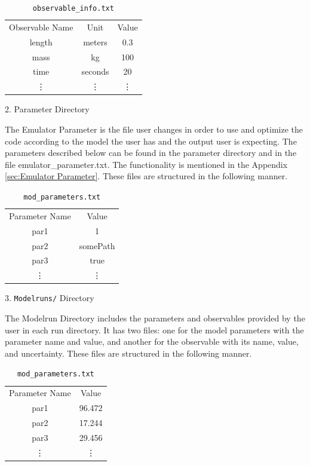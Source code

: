 \documentclass[12pt]{article}
\numberwithin{equation}{section}
\numberwithin{figure}{section}
\begin{document}
\begin{table}[!h]
    \centering
    \begin{tabular}{c|c|c}
         Observable Name & Unit & Value\\
         length & meters & 0.3 \\
         mass & kg & 100 \\
         time & seconds & 20 \\
          \vdots & \vdots & \vdots 
    \end{tabular}
    \caption{{\tt{observable\_info.txt}}}
    \label{tab:my_label}
\end{table}

2. Parameter Directory 

The Emulator Parameter is the file user changes in order to use and optimize the code according to the model the user has and the output user is expecting. The parameters described below can be found in the parameter directory and in the file emulator\_parameter.txt. The functionality is mentioned in the Appendix \ref{sec:Emulator Parameter}. These files are structured in the following manner.

\begin{table}[!h]
    \centering
    \begin{tabular}{c|c}
         Parameter Name & Value \\
         par1 & 1 \\
         par2 & somePath \\
         par3 & true \\
          \vdots & \vdots 
    \end{tabular}
    \caption{{\tt{mod\_parameters.txt}}}
    \label{tab:my_label}
\end{table}

\newpage

3. {\tt Modelruns/} Directory

The Modelrun Directory includes the parameters and observables provided by the user in each run directory. It has two files: one for the model parameters with the parameter name and value, and another for the observable with its name, value, and uncertainty. These files are structured in the following manner.

\begin{table}[!h]
    \centering
    \begin{tabular}{c|c}
         Parameter Name & Value \\
         par1 & 96.472 \\
         par2 & 17.244 \\
         par3 & 29.456 \\
          \vdots & \vdots 
    \end{tabular}
    \caption{{\tt{mod\_parameters.txt}}}
    \label{tab:my_label}
\end{table}
\end{document}
